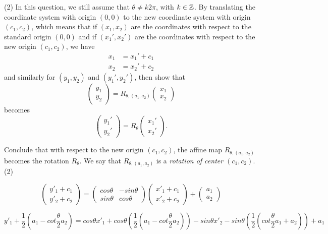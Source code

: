 \documentclass[12pt]{article}
\begin{document}
\medskip
(2)
In this question, we still assume that
 $\theta\not= k 2\pi$, with $k \in \mathbb{Z}$.
By translating the coordinate system with origin $(0, 0)$
to the new coordinate system with origin $(c_1, c_2)$, which
means that if $(x_1, x_2)$ are the coordinates with respect to the 
standard origin $(0, 0)$ and if $(x_1', x_2')$ are the coordinates with respect 
to the new origin $(c_1, c_2)$,  we have
\begin{align*}
x_1 & = x_1' + c_1 \\
x_2 & = x_2' + c_2
\end{align*}
and similarly for $(y_1, y_2)$ and $(y_1', y_2')$,
then show that 
\[
\begin{pmatrix}
y_1 \\
y_2
\end{pmatrix} 
=
R_{\theta, (a_1,a_2)}
\begin{pmatrix}
x_1 \\
x_2
\end{pmatrix}
\]
becomes
\[
\begin{pmatrix}
y_1' \\
y_2'
\end{pmatrix} 
=
R_{\theta}
\begin{pmatrix}
x_1' \\
x_2'
\end{pmatrix}.
\]

\medskip
Conclude that with respect to the new origin $(c_1, c_2)$, 
the affine map $R_{\theta, (a_1,a_2)}$ becomes the 
rotation $R_{\theta}$. We say that $R_{\theta, (a_1,a_2)}$ 
is a {\it rotation of center $(c_1, c_2)$\/}.
\vspace{0.25 cm}
(2) 

\[\begin{pmatrix} y'_1 + c_1\\y'_2 + c_2 \end{pmatrix} = \begin{pmatrix} cos\theta & -sin\theta \\ 
sin\theta & cos\theta \end{pmatrix} \begin{pmatrix} x'_1 + c_1\\x'_2 + c_2 \end{pmatrix} + \begin{pmatrix} a_1 \\ a_2 \end{pmatrix}\]

\[y'_1 + \frac{1}{2}(a_1 - cot\frac{\theta}{2} a_2) =  cos\theta x'_1 + cos\theta (\frac{1}{2}(a_1 - cot \frac{\theta}{2} a_2)) - sin\theta x'_2 - sin\theta (\frac{1}{2} (cot \frac{\theta}{2}a_1 + a_2)) + a_1 \]
\end{document}
